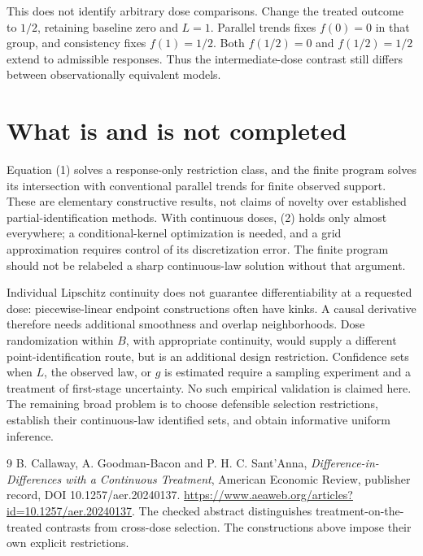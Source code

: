 \documentclass[11pt,a4paper]{article}
\begin{document}
This does not identify arbitrary dose comparisons. Change the treated outcome to $1/2$, retaining baseline zero and $L=1$. Parallel trends fixes $f(0)=0$ in that group, and consistency fixes $f(1)=1/2$. Both $f(1/2)=0$ and $f(1/2)=1/2$ extend to admissible responses. Thus the intermediate-dose contrast still differs between observationally equivalent models.

\section{What is and is not completed}
Equation (1) solves a response-only restriction class, and the finite program solves its intersection with conventional parallel trends for finite observed support. These are elementary constructive results, not claims of novelty over established partial-identification methods. With continuous doses, (2) holds only almost everywhere; a conditional-kernel optimization is needed, and a grid approximation requires control of its discretization error. The finite program should not be relabeled a sharp continuous-law solution without that argument.

Individual Lipschitz continuity does not guarantee differentiability at a requested dose: piecewise-linear endpoint constructions often have kinks. A causal derivative therefore needs additional smoothness and overlap neighborhoods. Dose randomization within $B$, with appropriate continuity, would supply a different point-identification route, but is an additional design restriction. Confidence sets when $L$, the observed law, or $g$ is estimated require a sampling experiment and a treatment of first-stage uncertainty. No such empirical validation is claimed here. The remaining broad problem is to choose defensible selection restrictions, establish their continuous-law identified sets, and obtain informative uniform inference.

\begin{thebibliography}{9}
 B. Callaway, A. Goodman-Bacon and P. H. C. Sant'Anna, \emph{Difference-in-Differences with a Continuous Treatment}, American Economic Review, publisher record, DOI 10.1257/aer.20240137. \url{https://www.aeaweb.org/articles?id=10.1257/aer.20240137}. The checked abstract distinguishes treatment-on-the-treated contrasts from cross-dose selection. The constructions above impose their own explicit restrictions.
\end{thebibliography}
\end{document}
